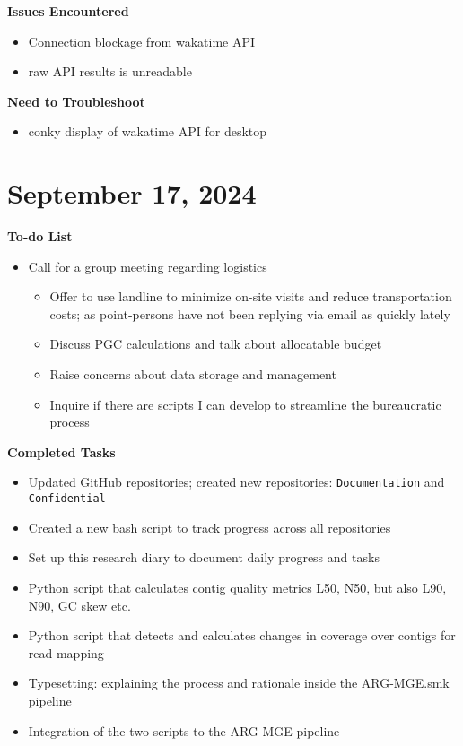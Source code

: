 \documentclass[11pt]{report}
\newcommand{\done}{\checkmark}
\newcommand{\moved}{\faArrowCircleRight}
\begin{document}
{\textbf{Issues Encountered}
\begin{itemize}
	\item [\done] Connection blockage from wakatime API
	\item [\moved] raw API results is unreadable
\end{itemize}

\textbf{Need to Troubleshoot}
\begin{itemize}
	\item conky display of wakatime API for desktop
\end{itemize}


\newpage
\onecolumn


\onecolumn
\newpage


\section{September 17, 2024}

\textbf{To-do List}
\begin{itemize}
	\item [\moved] Call for a group meeting regarding logistics
	
	\begin{itemize}
		\item [\moved] Offer to use landline to minimize on-site visits and reduce transportation costs; as point-persons have not been replying via email as quickly lately
		\item [\moved] Discuss PGC calculations and talk about allocatable budget
		\item [\moved] Raise concerns about data storage and management
		\item [\moved] Inquire if there are scripts I can develop to streamline the bureaucratic process
	\end{itemize}
\end{itemize}

\textbf{Completed Tasks}
\begin{itemize}
	\item [\done] Updated GitHub repositories; created new repositories: \texttt{Documentation} and \texttt{Confidential}
	\item [\done] Created a new bash script to track progress across all repositories
	\item [\done] Set up this research diary to document daily progress and tasks
	\item [\done] Python script that calculates contig quality metrics L50, N50, but also L90, N90, GC skew etc.
	\item [\done] Python script that detects and calculates changes in coverage over contigs for read mapping
	\item [\done] Typesetting: explaining the process and rationale inside the ARG-MGE.smk pipeline
	\item [\done] Integration of the two scripts to the ARG-MGE pipeline
	

\end{itemize}}
\end{document}
